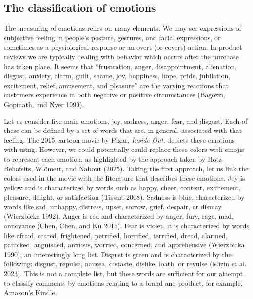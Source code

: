 \subsection{The classification of emotions}\label{emotions-classification}

The measuring of emotions relies on many elements. We may see expressions of
subjective feeling in people's posture, gestures, and facial
expressions, or sometimes as a physiological response or an overt (or
covert) action. In product reviews we are typically dealing with
behavior which occurs after the purchase has taken place. It seems that ``frustration, anger,
disappointment, alienation, disgust, anxiety, alarm, guilt, shame, joy,
happiness, hope, pride, jubilation, excitement, relief, amusement, and
pleasure'' are the varying reactions that customers experience in both negative
or positive circumstances (Bagozzi, Gopinath, and Nyer 1999).

Let us consider five main emotions, joy,
sadness, anger, fear, and disgust. Each of these can be defined by a set
of words that are, in general, associated with that feeling. The 2015
cartoon movie by Pixar, \textit{Inside Out}, depicts these emotions with using.
However, we could potentially could replace these colors with
emojis to represent each emotion, as highlighted by the approach taken by
Hotz-Behofsits, Wlömert, and Nabout (2025). Taking the first approach, let us link the colors used in
the movie with the literature that describes these emotions. Joy is yellow
and is characterized by words such as happy, cheer, content, excitement,
pleasure, delight, or satisfaction (Tissari 2008). Sadness is blue,
characterized by words like sad, unhappy, distress, upset, sorrow,
grief, despair, or dismay (Wierzbicka 1992). Anger is red and
characterized by anger, fury, rage, mad, annoyance (Chen,
Chen, and Ku 2015). Fear is violet, it is characterized by words like
afraid, scared, frightened, petrified, horrified, terrified, dread,
alarmed, panicked, anguished, anxious, worried, concerned, and
apprehensive (Wierzbicka 1990), an interestingly long list.
Disgust is green and is characterized by the following: disgust, repulse,
nausea, distaste, dislike, loath, or revulse (Mizin et al. 2023). This is not a complete list, but these words are sufficient for our attempt to classify comments by emotions relating to a brand and product, for example,
Amazon's Kindle.

